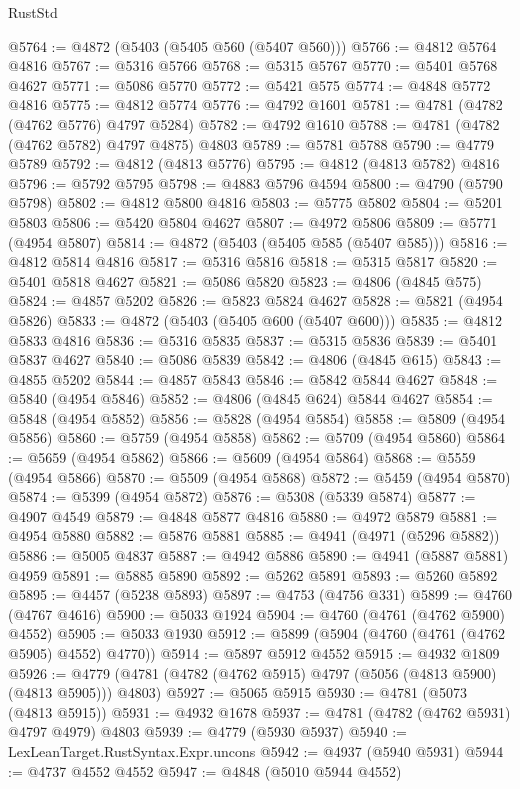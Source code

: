 \begin{lexlean}{RustStd}
\begin{coremodule}
@5764 := @4872 (@5403 (@5405 @560 (@5407 @560)))
@5766 := @4812 @5764 @4816
@5767 := @5316 @5766
@5768 := @5315 @5767
@5770 := @5401 @5768 @4627
@5771 := @5086 @5770
@5772 := @5421 @575
@5774 := @4848 @5772 @4816
@5775 := @4812 @5774
@5776 := @4792 @1601
@5781 := @4781 (@4782 (@4762 @5776) @4797 @5284)
@5782 := @4792 @1610
@5788 := @4781 (@4782 (@4762 @5782) @4797 @4875) @4803
@5789 := @5781 @5788
@5790 := @4779 @5789
@5792 := @4812 (@4813 @5776)
@5795 := @4812 (@4813 @5782) @4816
@5796 := @5792 @5795
@5798 := @4883 @5796 @4594
@5800 := @4790 (@5790 @5798)
@5802 := @4812 @5800 @4816
@5803 := @5775 @5802
@5804 := @5201 @5803
@5806 := @5420 @5804 @4627
@5807 := @4972 @5806
@5809 := @5771 (@4954 @5807)
@5814 := @4872 (@5403 (@5405 @585 (@5407 @585)))
@5816 := @4812 @5814 @4816
@5817 := @5316 @5816
@5818 := @5315 @5817
@5820 := @5401 @5818 @4627
@5821 := @5086 @5820
@5823 := @4806 (@4845 @575)
@5824 := @4857 @5202
@5826 := @5823 @5824 @4627
@5828 := @5821 (@4954 @5826)
@5833 := @4872 (@5403 (@5405 @600 (@5407 @600)))
@5835 := @4812 @5833 @4816
@5836 := @5316 @5835
@5837 := @5315 @5836
@5839 := @5401 @5837 @4627
@5840 := @5086 @5839
@5842 := @4806 (@4845 @615)
@5843 := @4855 @5202
@5844 := @4857 @5843
@5846 := @5842 @5844 @4627
@5848 := @5840 (@4954 @5846)
@5852 := @4806 (@4845 @624) @5844 @4627
@5854 := @5848 (@4954 @5852)
@5856 := @5828 (@4954 @5854)
@5858 := @5809 (@4954 @5856)
@5860 := @5759 (@4954 @5858)
@5862 := @5709 (@4954 @5860)
@5864 := @5659 (@4954 @5862)
@5866 := @5609 (@4954 @5864)
@5868 := @5559 (@4954 @5866)
@5870 := @5509 (@4954 @5868)
@5872 := @5459 (@4954 @5870)
@5874 := @5399 (@4954 @5872)
@5876 := @5308 (@5339 @5874)
@5877 := @4907 @4549
@5879 := @4848 @5877 @4816
@5880 := @4972 @5879
@5881 := @4954 @5880
@5882 := @5876 @5881
@5885 := @4941 (@4971 (@5296 @5882))
@5886 := @5005 @4837
@5887 := @4942 @5886
@5890 := @4941 (@5887 @5881) @4959
@5891 := @5885 @5890
@5892 := @5262 @5891
@5893 := @5260 @5892
@5895 := @4457 (@5238 @5893)
@5897 := @4753 (@4756 @331)
@5899 := @4760 (@4767 @4616)
@5900 := @5033 @1924
@5904 := @4760 (@4761 (@4762 @5900) @4552)
@5905 := @5033 @1930
@5912 := @5899 (@5904 (@4760 (@4761 (@4762 @5905) @4552) @4770))
@5914 := @5897 @5912 @4552
@5915 := @4932 @1809
@5926 := @4779 (@4781 (@4782 (@4762 @5915) @4797 (@5056 (@4813 @5900) (@4813 @5905))) @4803)
@5927 := @5065 @5915
@5930 := @4781 (@5073 (@4813 @5915))
@5931 := @4932 @1678
@5937 := @4781 (@4782 (@4762 @5931) @4797 @4979) @4803
@5939 := @4779 (@5930 @5937)
@5940 := LexLeanTarget.RustSyntax.Expr.uncons
@5942 := @4937 (@5940 @5931)
@5944 := @4737 @4552 @4552
@5947 := @4848 (@5010 @5944 @4552)

\end{coremodule}
\end{lexlean}
